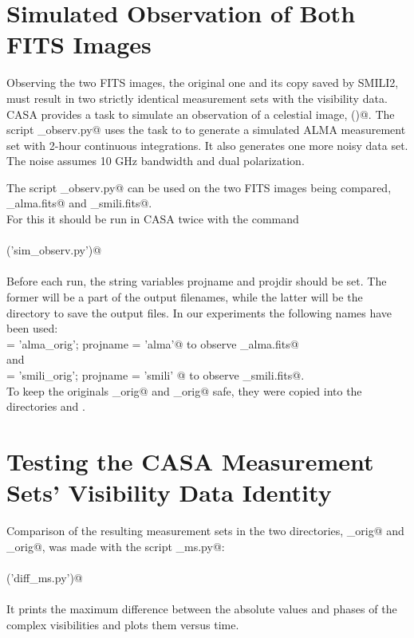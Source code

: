 \documentclass[preprint]{aastex}
\begin{document}
\section{Simulated Observation of Both FITS Images}

Observing the two FITS images, the original one and its copy saved by SMILI2, must result in two strictly identical measurement sets with the visibility data. CASA provides a task to simulate an observation of a celestial image, \verb@simobserve()@. The script \verb@sim_observ.py@ uses the task to to generate a simulated ALMA measurement set with 2-hour continuous integrations. It also generates one more noisy data set. The noise assumes 10 GHz bandwidth and dual polarization. 

The script \verb@sim_observ.py@ can be used on the two FITS images being compared, \\ \verb@RoundSpottyDisk_alma.fits@ and \verb@RoundSpottyDisk_smili.fits@. \\
For this it should be run in CASA twice with the command \\
\\
\verb@execfile('sim_observ.py')@ \\
\\
Before each run, the string variables projname and projdir should be set. The former will be a part of the output filenames, while the latter will be the directory to save the output files. In our experiments the following names have been used: \\
\verb@projdir = 'alma_orig'; projname = 'alma'@ to observe \verb@RoundSpottyDisk_alma.fits@ \\
and \\
\verb@projdir = 'smili_orig'; projname = 'smili' @  to observe \verb@RoundSpottyDisk_smili.fits@. \\

To keep the originals \verb@alma_orig@ and \verb@smili_orig@ safe, they were copied into the directories \verb@alma@ and \verb@smili@.


\section{Testing the CASA Measurement Sets' Visibility Data Identity}

Comparison of the resulting measurement sets in the two directories, \verb@alma_orig@ and \verb@smili_orig@, was made with the script \verb@diff_ms.py@: \\
\\
\verb@execfile('diff_ms.py')@ \\
\\
It prints the maximum difference between the absolute values and phases of the complex visibilities and plots them versus time. 
\end{document}
